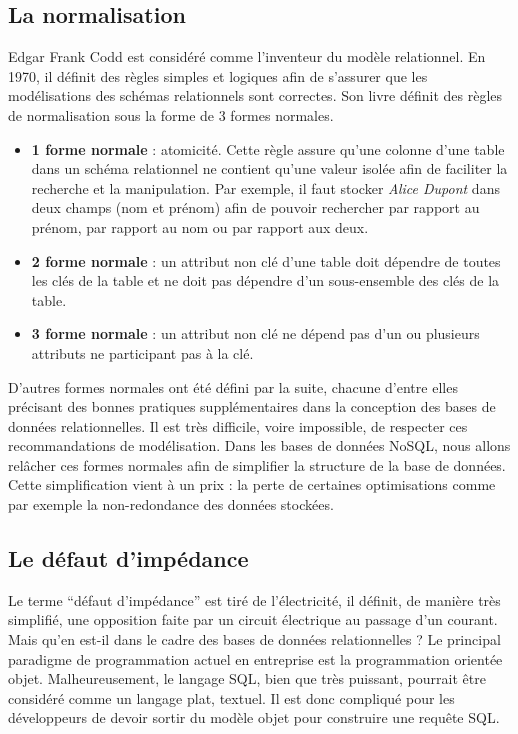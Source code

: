 \subsection{La normalisation}

    Edgar Frank Codd est considéré comme l'inventeur du modèle relationnel. En 1970, il définit des règles simples et logiques afin de s'assurer que les modélisations des schémas relationnels sont correctes\cite{Wikipedia_Edgar_Frank_Codd}. Son livre définit des règles de normalisation sous la forme de 3 formes normales.
    \vspace{10px}
    \begin{itemize}
      \item \textbf{1\iere{} forme normale} : atomicité. Cette règle assure qu'une colonne d'une table dans un schéma relationnel ne contient qu'une valeur isolée afin de faciliter la recherche et la manipulation. Par exemple, il faut stocker \textit{Alice Dupont} dans deux champs (nom et prénom) afin de pouvoir rechercher par rapport au prénom, par rapport au nom ou par rapport aux deux.
      \item \textbf{2\ieme{} forme normale} : un attribut non clé d'une table doit dépendre de toutes les clés de la table et ne doit pas dépendre d'un sous-ensemble des clés de la table.
      \item \textbf{3\ieme{} forme normale} : un attribut non clé ne dépend pas d'un ou plusieurs attributs ne participant pas à la clé.
    \end{itemize}
    \vspace{20px}
    D'autres formes normales ont été défini par la suite, chacune d'entre elles précisant des bonnes pratiques supplémentaires dans la conception des bases de données relationnelles. Il est très difficile, voire impossible, de respecter ces recommandations de modélisation. Dans les bases de données NoSQL, nous allons relâcher ces formes normales afin de simplifier la structure de la base de données. Cette simplification vient à un prix : la perte de certaines optimisations comme par exemple la non-redondance des données stockées.

\subsection{Le défaut d'impédance}

  Le terme \enquote{défaut d'impédance} est tiré de l'électricité, il définit, de manière très simplifié, une opposition faite par un circuit électrique au passage d'un courant. Mais qu'en est-il dans le cadre des bases de données relationnelles ? Le principal paradigme de programmation actuel en entreprise est la programmation orientée objet. Malheureusement, le langage SQL, bien que très puissant, pourrait être considéré comme un langage plat, textuel. Il est donc compliqué pour les développeurs de devoir sortir du modèle objet pour construire une requête SQL.\\

